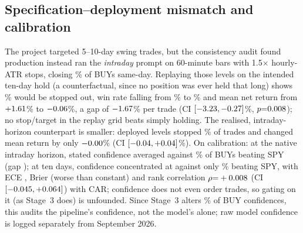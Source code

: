 \documentclass[conference]{IEEEtran}
\newcommand{\pct}[1]{$#1$\%}
\begin{document}
\fwdStatusTable

\begin{table}[t]
\centering
\caption{Fixed hypotheses in the early/late development windows: 10-day CAR difference in \% (rank correlation for H2), 95\% CI.}
\label{tab:forward}
\footnotesize\setlength{\tabcolsep}{2pt}
\end{table}

\subsection{Specification--deployment mismatch and calibration}
The project targeted 5--10-day swing trades, but the consistency audit found production instead ran the \emph{intraday} prompt on 60-minute bars with 1.5$\times$ hourly-ATR stops, closing \prodEod\% of \prodN{} BUYs same-day. Replaying those levels on the intended ten-day hold (a counterfactual, since no position was ever held that long) shows \depStopRate\% would be stopped out, win rate falling from \holdWin\% to \depWin\% and mean net return from \pct{\holdNet} to \pct{\depNet}, a gap of \pct{\depGap} per trade (CI \pct{\depGapCI}, $p{=}0.008$); no stop/target in the replay grid beats simply holding. The realised, intraday-horizon counterpart is smaller: deployed levels stopped \iStop\% of trades and changed mean return by only \pct{\iDepGap} (CI \pct{\iDepGapCI}). On calibration: at the native intraday horizon, stated confidence averaged \iConf{} against \iHit{}\% of BUYs beating SPY (gap \iEce{}); at ten days, confidence concentrated at \calConf{} against only \calWin\% beating SPY, with ECE \ece{}, Brier \brier{} (worse than \brierBase{} constant) and rank correlation $\rho{=}+0.008$ (CI $[-0.045, +0.064]$) with CAR; confidence does not even order trades, so gating on it (as Stage~3 does) is unfounded. Since Stage~3 alters \auStageChanged\% of BUY confidences, this audits the pipeline's confidence, not the model's alone; raw model confidence is logged separately from September 2026.
\end{document}
